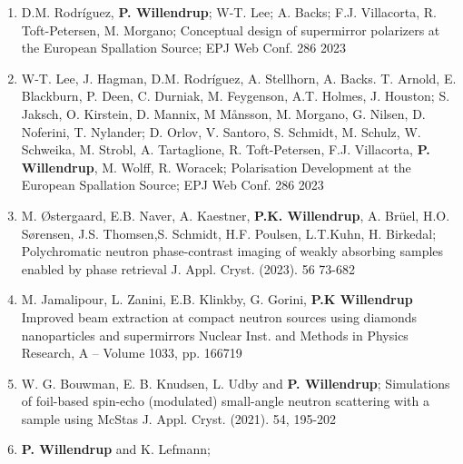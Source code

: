 \begin{enumerate}
    \item D.M. Rodríguez, {\bf P. Willendrup}; W-T. Lee; A. Backs;
      F.J. Villacorta, R. Toft-Petersen, M. Morgano;
      Conceptual design of supermirror polarizers at the European
      Spallation Source; EPJ Web Conf. 286 2023
      \\
    \item W-T. Lee, J. Hagman, D.M. Rodríguez, A. Stellhorn,
      A. Backs. T. Arnold, E. Blackburn, P. Deen, C. Durniak,
      M. Feygenson, A.T. Holmes, J. Houston; S. Jaksch, O. Kirstein,
      D. Mannix, M Månsson, M. Morgano, G. Nilsen, D. Noferini,
      T. Nylander; D. Orlov, V. Santoro, S. Schmidt, M. Schulz,
      W. Schweika, M. Strobl, A. Tartaglione, R. Toft-Petersen,
      F.J. Villacorta, {\bf P. Willendrup}, M. Wolff, R. Woracek;
      Polarisation Development at the European Spallation Source; EPJ
      Web Conf. 286 2023
      \\
    \item M. Østergaard, E.B. Naver, A. Kaestner, {\bf P.K. Willendrup},
      A. Brüel, H.O. Sørensen, J.S. Thomsen,S. Schmidt,
      H.F. Poulsen, L.T.Kuhn, H. Birkedal; Polychromatic neutron
      phase-contrast imaging of weakly absorbing samples enabled by
      phase retrieval J. Appl. Cryst. (2023). 56 73-682
      \\
    \item M. Jamalipour, L. Zanini, E.B. Klinkby, G. Gorini, {\bf P.K
        Willendrup} Improved beam extraction at compact neutron
      sources using diamonds nanoparticles and supermirrors
      Nuclear Inst. and Methods in Physics
      Research, A -- Volume 1033, pp. 166719
      \\
    \item W. G. Bouwman, E. B. Knudsen, L. Udby and {\bf  P. Willendrup};
       Simulations of foil-based spin-echo (modulated) small-angle
       neutron scattering with a sample using
       McStas J. Appl. Cryst. (2021). 54, 195-202 \\
     \item {\bf P. Willendrup} and K. Lefmann;

\end{enumerate}
